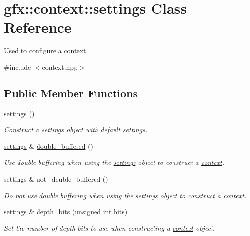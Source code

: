 \hypertarget{classgfx_1_1context_1_1settings}{\section{gfx\-:\-:context\-:\-:settings Class Reference}
\label{classgfx_1_1context_1_1settings}
}


Used to configure a \hyperlink{classgfx_1_1context}{context}.  




{\ttfamily \#include $<$context.\-hpp$>$}

\subsection*{Public Member Functions}
\begin{DoxyCompactItemize}
\item 
\hyperlink{classgfx_1_1context_1_1settings_a83843fc17d4e51082ca33a826fb4ee6a}{settings} ()
\begin{DoxyCompactList}\small\item\em Construct a \hyperlink{classgfx_1_1context_1_1settings}{settings} object with default settings. \end{DoxyCompactList}\item 
\hyperlink{classgfx_1_1context_1_1settings}{settings} \& \hyperlink{classgfx_1_1context_1_1settings_a1c83c9a92e8daa1e408ac400ce951476}{double\-\_\-buffered} ()
\begin{DoxyCompactList}\small\item\em Use double buffering when using the \hyperlink{classgfx_1_1context_1_1settings}{settings} object to construct a \hyperlink{classgfx_1_1context}{context}. \end{DoxyCompactList}\item 
\hyperlink{classgfx_1_1context_1_1settings}{settings} \& \hyperlink{classgfx_1_1context_1_1settings_a108a98592538904d1c4a7b253de46f5f}{not\-\_\-double\-\_\-buffered} ()
\begin{DoxyCompactList}\small\item\em Do not use double buffering when using the \hyperlink{classgfx_1_1context_1_1settings}{settings} object to construct a \hyperlink{classgfx_1_1context}{context}. \end{DoxyCompactList}\item 
\hyperlink{classgfx_1_1context_1_1settings}{settings} \& \hyperlink{classgfx_1_1context_1_1settings_a79034b85648e322afa5a75df9ed0e0f1}{depth\-\_\-bits} (unsigned int bits)
\begin{DoxyCompactList}\small\item\em Set the number of depth bits to use when constructing a \hyperlink{classgfx_1_1context}{context} object. \end{DoxyCompactList}\end{DoxyCompactItemize}
